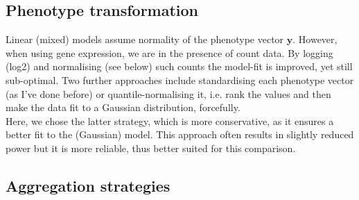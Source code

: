 




\subsection{Phenotype transformation}

Linear (mixed) models assume normality of the phenotype vector $\mathbf{y}$.
However, when using gene expression, we are in the presence of count data.
By logging (log2) and normalising (see below) such counts the model-fit is improved, yet still sub-optimal.
Two further approaches include standardising each phenotype vector (as I've done before) or quantile-normalising it, i.e. rank the values and then make the data fit to a Gaussian distribution, forcefully.\\

Here, we chose the latter strategy, which is more conservative, as it ensures a better fit to the (Gaussian) model.
This approach often results in slightly reduced power but it is more reliable, thus better suited for this comparison.

\subsection{Aggregation strategies}


